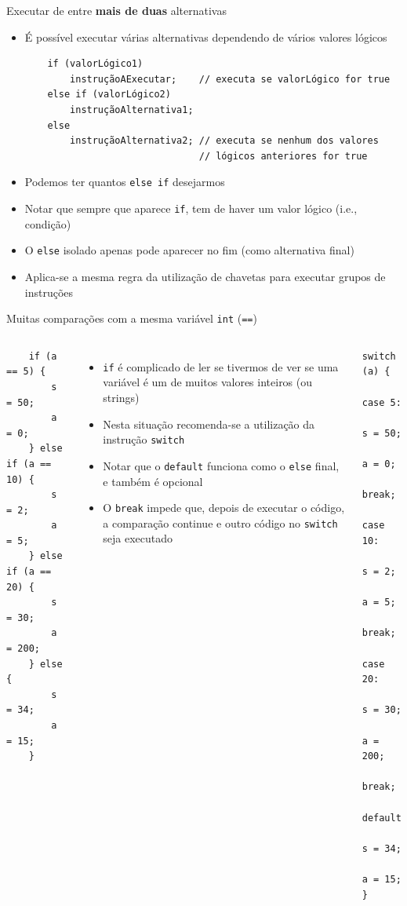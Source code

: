 \documentclass[portuguese, aspectratio=169, xcolor=table]{beamer}
\begin{document}
\begin{frame}[fragile]{Executar de entre \textbf{mais de duas} alternativas}
\begin{itemize}
\item É possível executar várias alternativas dependendo de vários valores lógicos
\begin{verbatim}
    if (valorLógico1)
        instruçãoAExecutar;    // executa se valorLógico for true
    else if (valorLógico2)
        instruçãoAlternativa1;
    else
        instruçãoAlternativa2; // executa se nenhum dos valores 
                               // lógicos anteriores for true
\end{verbatim}
\item Podemos ter quantos \texttt{else if} desejarmos
\item Notar que sempre que aparece \texttt{if}, tem de haver um valor lógico (i.e., condição)
\item O \texttt{else} isolado apenas pode aparecer no fim (como alternativa final)
\item Aplica-se a mesma regra da utilização de chavetas para executar grupos de instruções
\end{itemize}
\end{frame}


\begin{frame}[fragile]{Muitas comparações com a mesma variável \texttt{int} (\texttt{==})}
\begin{columns}[t]

\begin{verbatim}
    if (a == 5) {
        s = 50;
        a = 0;
    } else if (a == 10) {
        s = 2;
        a = 5;
    } else if (a == 20) {
        s = 30;
        a = 200;
    } else {
        s = 34;
        a = 15;
    }
\end{verbatim}
\begin{itemize}
    \item \texttt{if} é complicado de ler se tivermos de ver se uma variável é um de muitos valores inteiros (ou strings)
    \item Nesta situação recomenda-se a utilização da instrução \texttt{switch}
    \item Notar que o \texttt{default} funciona como o \texttt{else} final, e também é opcional
    \item O \texttt{break} impede que, depois de executar o código, a comparação continue e outro código no \texttt{switch} seja executado
\end{itemize}
\begin{verbatim}
switch (a) {
    case 5:
        s = 50;
        a = 0;
        break;
    case 10:
        s = 2;
        a = 5;
        break;
    case 20:
        s = 30;
        a = 200;
        break;
    default:
        s = 34;
        a = 15;
}
\end{verbatim}
\end{columns}
\end{frame}
\end{document}
